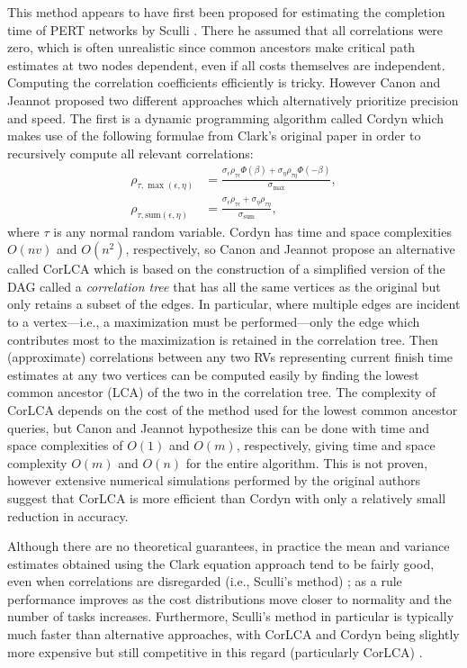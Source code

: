 \documentclass[12pt]{article}
\begin{document}
This method appears to have first been proposed for estimating the completion time of PERT networks by Sculli \cite{scu83}. There he assumed that all correlations were zero, which is often unrealistic since common ancestors make critical path estimates at two nodes dependent, even if all costs themselves are independent. Computing the correlation coefficients efficiently is tricky. However Canon and Jeannot \cite{can16} proposed two different approaches which alternatively prioritize precision and speed. The first is a dynamic programming algorithm called Cordyn which makes use of the following formulae from Clark's original paper in order to recursively compute all relevant correlations:
\begin{align}
\rho_{\tau, \max(\epsilon, \eta)} &= \frac{\sigma_\epsilon \rho_{\tau \epsilon} \Phi(\beta) + \sigma_\eta \rho_{\tau \eta} \Phi(-\beta)}{\sigma_{\max}}, \label{eq.max_corr}\\
\rho_{\tau, \text{sum}(\epsilon, \eta)} &= \frac{\sigma_\epsilon \rho_{\tau \epsilon} + \sigma_\eta \rho_{\tau \eta} }{\sigma_{\text{sum}}}, \label{eq.sum_corr}
\end{align} 
where $\tau$ is any normal random variable. Cordyn has time and space complexities $O(nv)$ and $O(n^2)$, respectively, so Canon and Jeannot propose an alternative called CorLCA which is based on the construction of a simplified version of the DAG called a {\em correlation tree} that has all the same vertices as the original but only retains a subset of the edges. In particular, where multiple edges are incident to a vertex---i.e., a maximization must be performed---only the edge which contributes most to the maximization is retained in the correlation tree. Then (approximate) correlations between any two RVs representing current finish time estimates at any two vertices can be computed easily by finding the lowest common ancestor (LCA) of the two in the correlation tree. The complexity of CorLCA depends on the cost of the method used for the lowest common ancestor queries, but Canon and Jeannot hypothesize this can be done with time and space complexities of $O(1)$ and $O(m)$, respectively, giving time and space complexity $O(m)$ and $O(n)$ for the entire algorithm. This is not proven, however extensive numerical simulations performed by the original authors suggest that CorLCA is more efficient than Cordyn with only a relatively small reduction in accuracy. 

Although there are no theoretical guarantees, in practice the mean and variance estimates obtained using the Clark equation approach tend to be fairly good, even when correlations are disregarded (i.e., Sculli's method) \cite{kam85}; as a rule performance improves as the cost distributions move closer to normality and the number of tasks increases. Furthermore, Sculli's method in particular is typically much faster than alternative approaches, with CorLCA and Cordyn being slightly more expensive but still competitive in this regard (particularly CorLCA) \cite{can16}.
\end{document}
